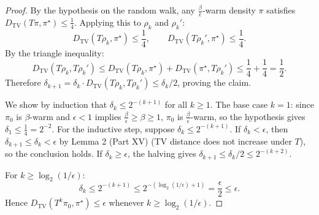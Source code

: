\documentclass[12pt]{article}
\begin{document}
\begin{proof}
By the hypothesis on the random walk, any $\frac{\beta}{\epsilon}$-warm density $\pi$ satisfies $D_{\mathrm{TV}}(T\pi, \pi^\star) \le \frac{1}{4}$. Applying this to $\rho_k$ and $\rho_k'$:
\[
D_{\mathrm{TV}}(T\rho_k, \pi^\star) \le \frac{1}{4}, \qquad D_{\mathrm{TV}}(T\rho_k', \pi^\star) \le \frac{1}{4}.
\]
By the triangle inequality:
\[
D_{\mathrm{TV}}(T\rho_k, T\rho_k') \le D_{\mathrm{TV}}(T\rho_k, \pi^\star) + D_{\mathrm{TV}}(\pi^\star, T\rho_k') \le \frac{1}{4} + \frac{1}{4} = \frac{1}{2}.
\]
Therefore $\delta_{k+1} = \delta_k \cdot D_{\mathrm{TV}}(T\rho_k, T\rho_k') \le \delta_k / 2$, proving the claim.

We show by induction that $\delta_k \le 2^{-(k+1)}$ for all $k \ge 1$. The base case $k = 1$: since $\pi_0$ is $\beta$-warm and $\epsilon < 1$ implies $\frac{\beta}{\epsilon} \ge \beta \ge 1$, $\pi_0$ is $\frac{\beta}{\epsilon}$-warm, so the hypothesis gives $\delta_1 \le \frac{1}{4} = 2^{-2}$. For the inductive step, suppose $\delta_k \le 2^{-(k+1)}$. If $\delta_k < \epsilon$, then $\delta_{k+1} \le \delta_k < \epsilon$ by Lemma 2 (Part XV) (TV distance does not increase under $T$), so the conclusion holds. If $\delta_k \ge \epsilon$, the halving gives $\delta_{k+1} \le \delta_k / 2 \le 2^{-(k+2)}$.

For $k \ge \log_2(1/\epsilon)$:
\[
\delta_k \le 2^{-(k+1)} \le 2^{-(\log_2(1/\epsilon) + 1)} = \frac{\epsilon}{2} \le \epsilon.
\]
Hence $D_{\mathrm{TV}}(T^k \pi_0, \pi^\star) \le \epsilon$ whenever $k \ge \log_2(1/\epsilon)$.
\end{proof}
\end{document}
